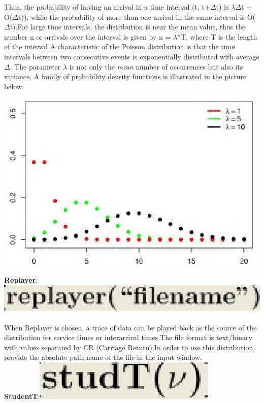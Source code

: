 Thus, the probability of having an arrival in a time interval (t, t+$\Delta$t) is $\lambda$$\Delta$t + O($\Delta$t)), while the probability of more than one  arrival in the same interval is O($\Delta$t).For large time intervals, the distribution is near the mean value, thus the number n or arrivals over the interval is given by n = $\lambda$*T, where T is the length of the interval
A characteristic of the Poisson distribution is that the time intervals between two consecutive events is exponentially distributed with average $\Delta$.
The parameter $\lambda$ is not only the \emph{mean} number of occurrences but also its variance.
A family of probability density functions is illustrated in the picture below.\\
\begin{center}
\includegraphics[scale=.5]{img/jsim/poisson_pdf_d.eps}
\end{center}
\textbf{Replayer}: \includegraphics[scale=.5]{img/jsim/replayer_f.eps}\\\\
When Replayer is chosen, a trace of data can be played back as the source of the distribution for service times or interarrival times.The file format is text/binary with values separated by CR (Carriage Return).In order to use this distribution, provide the absolute path name of the file in the input window.\\
\textbf{StudentT}:\includegraphics[scale=.5]{img/jsim/studentT_f.eps}\\\\
$$
